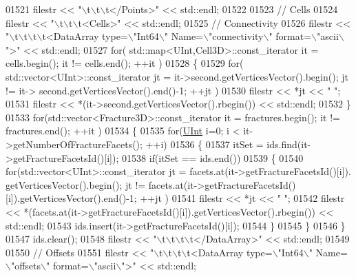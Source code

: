 \begin{DoxyCode}
01521     filestr << \textcolor{stringliteral}{"\(\backslash\)t\(\backslash\)t\(\backslash\)t</Points>"} << std::endl;
01522 
01523     \textcolor{comment}{// Cells}
01524     filestr << \textcolor{stringliteral}{"\(\backslash\)t\(\backslash\)t\(\backslash\)t<Cells>"} << std::endl;
01525     \textcolor{comment}{//  Connectivity}
01526     filestr << \textcolor{stringliteral}{"\(\backslash\)t\(\backslash\)t\(\backslash\)t\(\backslash\)t<DataArray type=\(\backslash\)"Int64\(\backslash\)" Name=\(\backslash\)"connectivity\(\backslash\)" format=\(\backslash\)"ascii\(\backslash\)">"} << std::endl;
01527     \textcolor{keywordflow}{for}( std::map<UInt,Cell3D>::const\_iterator it = cells.begin(); it != cells.end(); ++it )
01528     \{
01529         \textcolor{keywordflow}{for}( std::vector<UInt>::const\_iterator jt = it->second.getVerticesVector().begin(); jt != it->
      second.getVerticesVector().end()-1; ++jt )
01530             filestr << *jt << \textcolor{stringliteral}{" "};
01531         filestr << *(it->second.getVerticesVector().rbegin()) << std::endl;
01532     \}
01533     \textcolor{keywordflow}{for}(std::vector<Fracture3D>::const\_iterator it = fractures.begin(); it != fractures.end(); ++it )
01534     \{
01535         \textcolor{keywordflow}{for}(\hyperlink{namespaceFVCode3D_a4bf7e328c75d0fd504050d040ebe9eda}{UInt} i=0; i < it->getNumberOfFractureFacets(); ++i)
01536         \{
01537             itSet = ids.find(it->getFractureFacetsId()[i]);
01538             \textcolor{keywordflow}{if}(itSet == ids.end())
01539             \{
01540                 \textcolor{keywordflow}{for}(std::vector<UInt>::const\_iterator jt = facets.at(it->getFractureFacetsId()[i]).
      getVerticesVector().begin(); jt != facets.at(it->getFractureFacetsId()[i]).getVerticesVector().end()-1; ++jt )
01541                     filestr << *jt << \textcolor{stringliteral}{" "};
01542                 filestr << *(facets.at(it->getFractureFacetsId()[i]).getVerticesVector().rbegin()) << 
      std::endl;
01543                 ids.insert(it->getFractureFacetsId()[i]);
01544             \}
01545         \}
01546     \}
01547     ids.clear();
01548     filestr << \textcolor{stringliteral}{"\(\backslash\)t\(\backslash\)t\(\backslash\)t\(\backslash\)t</DataArray>"} << std::endl;
01549 
01550     \textcolor{comment}{//  Offsets}
01551     filestr << \textcolor{stringliteral}{"\(\backslash\)t\(\backslash\)t\(\backslash\)t\(\backslash\)t<DataArray type=\(\backslash\)"Int64\(\backslash\)" Name=\(\backslash\)"offsets\(\backslash\)" format=\(\backslash\)"ascii\(\backslash\)">"} << std::endl;

\end{DoxyCode}
